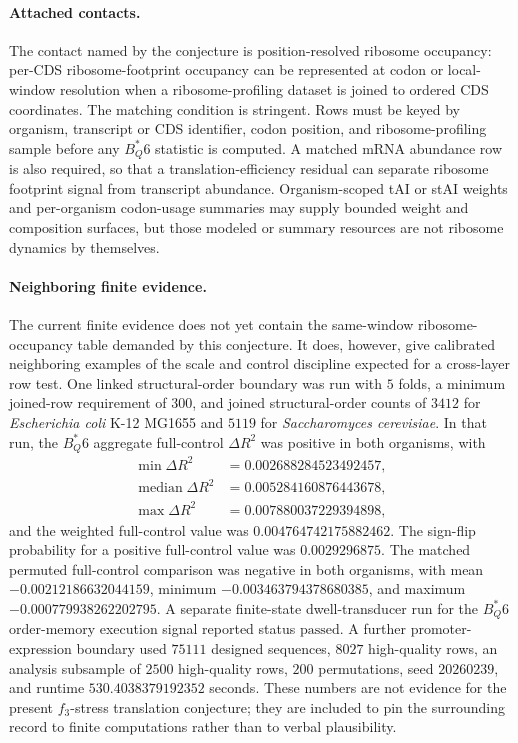 \paragraph{Attached contacts.}
The contact named by the conjecture is position-resolved ribosome occupancy: per-CDS ribosome-footprint occupancy can be represented at codon or local-window resolution when a ribosome-profiling dataset is joined to ordered CDS coordinates. The matching condition is stringent. Rows must be keyed by organism, transcript or CDS identifier, codon position, and ribosome-profiling sample before any $B^*_Q6$ statistic is computed. A matched mRNA abundance row is also required, so that a translation-efficiency residual can separate ribosome footprint signal from transcript abundance. Organism-scoped tAI or stAI weights and per-organism codon-usage summaries may supply bounded weight and composition surfaces, but those modeled or summary resources are not ribosome dynamics by themselves.

\paragraph{Neighboring finite evidence.}
The current finite evidence does not yet contain the same-window ribosome-occupancy table demanded by this conjecture. It does, however, give calibrated neighboring examples of the scale and control discipline expected for a cross-layer row test. One linked structural-order boundary was run with $5$ folds, a minimum joined-row requirement of $300$, and joined structural-order counts of $3412$ for \textit{Escherichia coli} K-12 MG1655 and $5119$ for \textit{Saccharomyces cerevisiae}. In that run, the $B^*_Q6$ aggregate full-control $\Delta R^2$ was positive in both organisms, with
$$
\begin{aligned}
\min \Delta R^2 &= 0.002688284523492457,\\
\operatorname{median}\Delta R^2 &= 0.005284160876443678,\\
\max \Delta R^2 &= 0.007880037229394898,
\end{aligned}
$$
and the weighted full-control value was $0.004764742175882462$. The sign-flip probability for a positive full-control value was $0.0029296875$. The matched permuted full-control comparison was negative in both organisms, with mean $-0.00212186632044159$, minimum $-0.003463794378680385$, and maximum $-0.000779938262202795$. A separate finite-state dwell-transducer run for the $B^*_Q6$ order-memory execution signal reported status $\mathrm{passed}$. A further promoter-expression boundary used $75111$ designed sequences, $8027$ high-quality rows, an analysis subsample of $2500$ high-quality rows, $200$ permutations, seed $20260239$, and runtime $530.4038379192352$ seconds. These numbers are not evidence for the present $f_3$-stress translation conjecture; they are included to pin the surrounding record to finite computations rather than to verbal plausibility.

